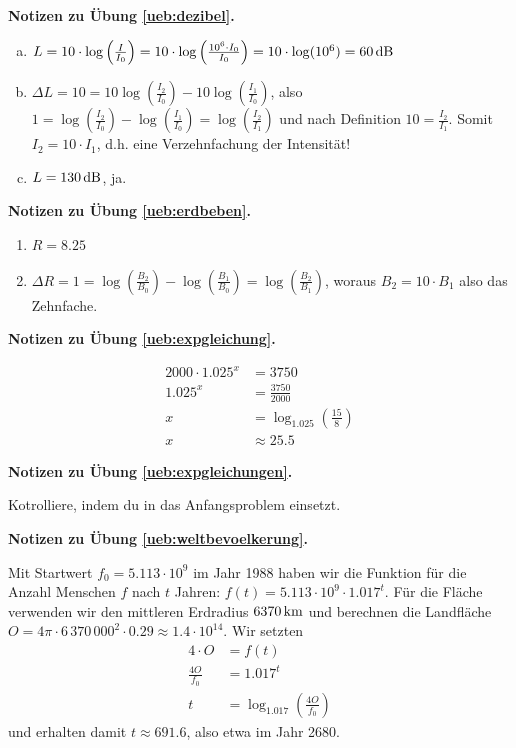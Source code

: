 \documentclass[%
11pt,%
twoside,%
titlepage,%
swissgerman,%
headsepline%
]{scrartcl}
\newcommand{\faReturnGray}{\textcolor{gray}{\faMailReply}} %
\theoremstyle{definition}
\theoremstyle{plain}
\newcommand{\concatueb}[1]{ueb:#1}%
\newcommand{\concatlsg}[1]{lsg:#1}%
\newenvironment{lsg}[1]{%
    \par\noindent\textbf{Notizen zu Übung \ref{\concatueb{#1}}.}%
    \label{\concatlsg{#1}} %
    \hfill\hyperref[\concatueb{#1}]{\faReturnGray}\par %
}{%
    \par%
}
\begin{document}
\begin{lsg}{dezibel}
    \begin{enumerate}[a)]
        \item $L=10\cdot\log\left(\frac{I}{I_0}\right)=10\cdot\log\left(\frac{10^6\cdot I_0}{I_0}\right)=10\cdot\log(10^6)=\unit[60]{dB}$
        \item $\Delta L=10=10\log(\frac{I_2}{I_0})-10\log(\frac{I_1}{I_0})$, also $1=\log(\frac{I_2}{I_0})-\log(\frac{I_1}{I_0})=\log(\frac{I_2}{I_1})$ und nach Definition $10=\frac{I_2}{I_1}$. Somit $I_2=10\cdot I_1$, d.h. eine Verzehnfachung der Intensität!
        \item $L=\unit[130]{dB}$, ja.
    \end{enumerate}
\end{lsg}
\begin{lsg}{erdbeben}
    \begin{enumerate}
        \item $R=8.25$
        \item $\Delta R=1=\log(\frac{B_2}{B_0})-\log(\frac{B_1}{B_0})=\log(\frac{B_2}{B_1})$, woraus $B_2=10\cdot B_1$ also das Zehnfache.
    \end{enumerate}
\end{lsg}
\begin{lsg}{expgleichung}
    \begin{align*}
        2000\cdot1.025^x &= 3750\tag{$\div2000$}\\
        1.025^x &= \frac{3750}{2000}\\
        x &= \log_1.025(\frac{15}{8})\\
        x &\approx25.5
    \end{align*}
\end{lsg}
\begin{lsg}{expgleichungen}
    Kotrolliere, indem du in das Anfangsproblem einsetzt.
\end{lsg}
\begin{lsg}{weltbevoelkerung}
    Mit Startwert $f_0=5.113\cdot10^9$ im Jahr 1988 haben wir die Funktion für die Anzahl Menschen $f$ nach $t$ Jahren: $f(t)=5.113\cdot10^9\cdot1.017^t$. Für die Fläche verwenden wir den mittleren Erdradius $\unit[6370]{km}$ und berechnen die Landfläche $O=4\pi\cdot6\,370\,000^2\cdot 0.29\approx1.4\cdot10^{14}$. Wir setzten
    \begin{align*}
        4\cdot O &= f(t)\\
        \frac{4O}{f_0} &= 1.017^t\\
        t &= \log_1.017(\frac{4O}{f_0})
    \end{align*}
    und erhalten damit $t\approx691.6$, also etwa im Jahr 2680.
\end{lsg}
\end{document}
